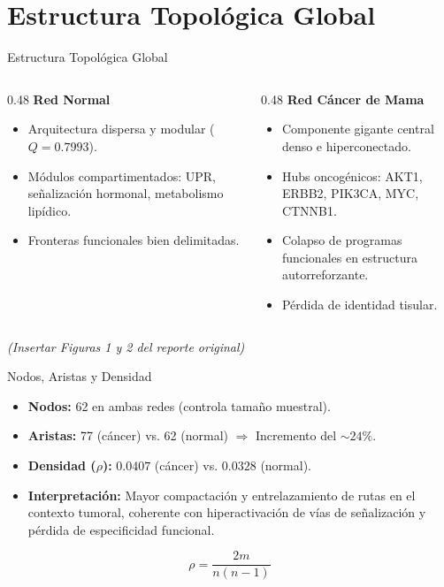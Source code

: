 \documentclass[12pt]{beamer}
\begin{document}
	\section{Estructura Topológica Global}
	\begin{frame}{Estructura Topológica Global}
		\begin{columns}
			\begin{column}{0.48\textwidth}
				\textbf{Red Normal}
				\begin{itemize}
					\item Arquitectura dispersa y modular ($Q = 0.7993$).
					\item Módulos compartimentados: UPR, señalización hormonal, metabolismo lipídico.
					\item Fronteras funcionales bien delimitadas.
				\end{itemize}
			\end{column}
			\begin{column}{0.48\textwidth}
				\textbf{Red Cáncer de Mama}
				\begin{itemize}
					\item Componente gigante central denso e hiperconectado.
					\item Hubs oncogénicos: AKT1, ERBB2, PIK3CA, MYC, CTNNB1.
					\item Colapso de programas funcionales en estructura autorreforzante.
					\item Pérdida de identidad tisular.
				\end{itemize}
			\end{column}
		\end{columns}
		\vspace{0.3cm}
		\centering \footnotesize \textit{(Insertar Figuras 1 y 2 del reporte original)}
	\end{frame}
	
	\begin{frame}{Nodos, Aristas y Densidad}
		\begin{itemize}
			\item \textbf{Nodos:} 62 en ambas redes (controla tamaño muestral).
			\item \textbf{Aristas:} 77 (cáncer) vs. 62 (normal) $\Rightarrow$ Incremento del $\sim 24\%$.
			\item \textbf{Densidad ($\rho$):} $0.0407$ (cáncer) vs. $0.0328$ (normal).
			\item \textbf{Interpretación:} Mayor compactación y entrelazamiento de rutas en el contexto tumoral, coherente con hiperactivación de vías de señalización y pérdida de especificidad funcional.
		\end{itemize}
		\begin{equation*}
			\rho = \frac{2m}{n(n-1)}
		\end{equation*}
	\end{frame}
	
\end{document}
